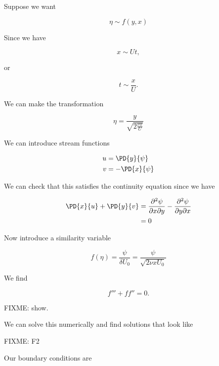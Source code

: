 Suppose we want

\begin{equation}\label{eqn:continuumL19:n}
\eta \sim f(y, x)
\end{equation}

Since we have

\begin{equation}\label{eqn:continuumL19:n}
x \sim U t,
\end{equation}

or

\begin{equation}\label{eqn:continuumL19:n}
t \sim \frac{x}{U}.
\end{equation}

We can make the transformation

\begin{equation}\label{eqn:continuumL19:n}
\eta = \frac{y}{\sqrt{2 \frac{\nu x}{U}}}
\end{equation}

We can introduce stream functions

\begin{align}\label{eqn:continuumProblemSet2:n}
u &= \PD{y}{\psi} \\
v &= -\PD{x}{\psi}
\end{align}

We can check that this satisfies the continuity equation since we have

\begin{align*}
\PD{x}{u} + \PD{y}{v} 
&=
\frac{\partial^2 \psi}{\partial x \partial y}
-\frac{\partial^2 \psi}{\partial y \partial x} \\
&= 0
\end{align*}

Now introduce a similarity variable 

\begin{equation}\label{eqn:continuumL19:n}
f(\eta) = \frac{\psi}{\delta U_0} = \frac{\psi}{\sqrt{2 \nu x U_0}}
\end{equation}

We find

\begin{equation}\label{eqn:continuumL19:n}
f''' + f f'' = 0.
\end{equation}

FIXME: show.

We can solve this numerically and find solutions that look like

FIXME: F2

Our boundary conditions are

